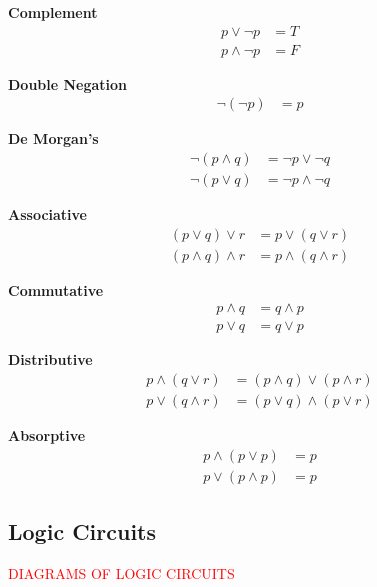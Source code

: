 \begin{law}\label{mod1:law:Complement}
	\textbf{Complement}
	\begin{align}
	p \lor \lnot p &= T\\
	p \land \lnot p &= F
	\end{align}
\end{law}

\begin{law}\label{mod1:law:DoubleNegation}
	\textbf{Double Negation}
	\begin{align}
	\lnot(\lnot p) &= p
	\end{align}
\end{law}

\begin{law}\label{mod1:law:DeMorgan}
	\textbf{De Morgan's}
	\begin{align}
	\lnot (p \land q) &= \lnot p \lor \lnot q \\
	\lnot (p \lor q) &= \lnot p \land \lnot q 
	\end{align}
\end{law}

\begin{law}\label{mod1:law:Associative}
	\textbf{Associative}
	\begin{align}
	(p \lor q) \lor r &= p \lor (q \lor r) \\
	(p \land q) \land r &= p \land (q \land r) 
	\end{align}
\end{law}

 \begin{law}\label{mod1:law:Commutative}
	\textbf{Commutative}
	\begin{align}
	p \land q &= q \land p \\
	p \lor q &= q \lor p
	\end{align}
\end{law}

\begin{law}\label{mod1:law:Distributive}
	\textbf{Distributive}
	\begin{align}
	p \land (q \lor r) &= (p \land q) \lor (p \land r) \\
	p \lor (q \land r) &= (p \lor q) \land (p \lor r) 
	\end{align}
\end{law}

\begin{law}\label{mod1:law:Absorptive}
	\textbf{Absorptive}
	\begin{align}
	p \land (p \lor p) &= p\\
	p \lor (p \land p) &= p
	\end{align}
\end{law}


\subsection{Logic Circuits}\label{LogicCircuits}

\textcolor{red}{DIAGRAMS OF LOGIC CIRCUITS}








		
		
		
		
		
		
		
		
		
		
		
		